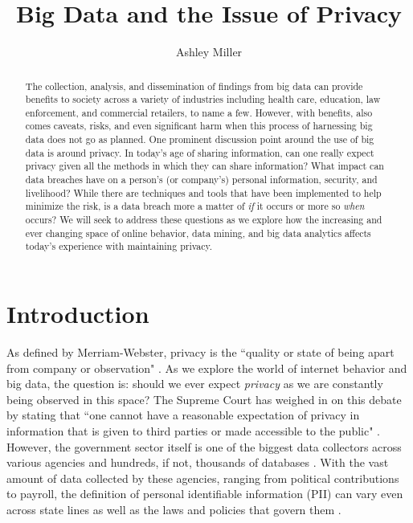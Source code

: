 \documentclass[sigconf]{acmart}
\begin{document}
\title{Big Data and the Issue of Privacy}


\author{Ashley Miller}



\renewcommand{\shortauthors}{G. v. Laszewski}


\begin{abstract}
The collection, analysis, and dissemination of findings from big data can provide benefits to society across a variety of industries including health care, education, law enforcement, and commercial retailers, to name a few. However, with benefits, also comes caveats, risks, and even significant harm when this process of harnessing big data does not go as planned. One prominent discussion point around the use of big data is around privacy. In today's age of sharing information, can one really expect privacy given all the methods in which they can share information? What impact can data breaches have on a person's (or company's) personal information, security, and livelihood? While there are techniques and tools that have been implemented to help minimize the risk, is a data breach more a matter of \textit{if} it occurs or more so \textit{when} occurs? We will seek to address these questions as we explore how the increasing and ever changing space of online behavior, data mining, and big data analytics affects today's experience with maintaining privacy.  
\end{abstract}


\maketitle

\section{Introduction}
As defined by Merriam-Webster, privacy is the ``quality or state of being apart from company or observation" \cite{Merriam-Webster2017}. As we explore the world of internet behavior and big data, the question is: should we ever expect \textit{privacy} as we are constantly being observed in this space? The Supreme Court has weighed in on this debate by stating that ``one cannot have a reasonable expectation of privacy in information that is given to third parties or made accessible to the public" \cite{Review2014}. However, the government sector itself is one of the biggest data collectors across various agencies and hundreds, if not, thousands of databases \cite{Review2014}. With the vast amount of data collected by these agencies, ranging from political contributions to payroll, the definition of personal identifiable information (PII) can vary even across state lines as well as the laws and policies that govern them \cite{Agelidis2016}. 
\end{document}
